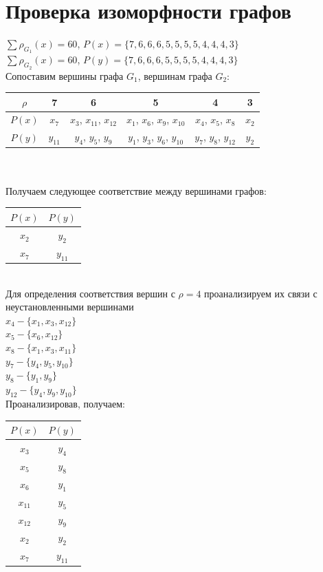 \documentclass[12pt,a4paper]{report}
\begin{document}
\section*{Проверка изоморфности графов}
$\sum\rho_{G_1}(x)=60$, $P(x)=\{7,6,6,6,5,5,5,5,4,4,4,3\}$\\
$\sum\rho_{G_2}(x)=60$, $P(y)=\{7,6,6,6,5,5,5,5,4,4,4,3\}$\\
\hfill\break
Сопоставим вершины графа $G_1$, вершинам графа $G_2$:\\
\hfill\break
\begin{tabular}{|c|c|c|c|c|c|}
    \hline
    $\rho$ & 7 & 6 & 5 & 4 & 3 \\
    \hline
    $P(x)$ & $x_7$ & $x_3$, $x_{11}$, $x_{12}$ & $x_1$, $x_6$, $x_9$, $x_{10}$ & $x_4$, $x_5$, $x_8$ & $x_2$ \\
    \hline
    $P(y)$ & $y_{11}$ & $y_4$, $y_5$, $y_9$ & $y_1$, $y_3$, $y_6$, $y_{10}$ & $y_7$, $y_8$, $y_{12}$ & $y_2$ \\
    \hline
\end{tabular}\\
\\
Получаем следующее соответствие между вершинами графов:\\
\hfill\break
\begin{tabular}{|c|c|}
    \hline
    $P(x)$ & $P(y)$ \\
    \hline
    $x_2$ & $y_2$ \\
    \hline
    $x_7$ & $y_{11}$ \\
    \hline
\end{tabular}\\
\hfill\break
Для определения соответствия вершин с $\rho=4$ проанализируем их связи с неустановленными вершинами\\
$x_4-\{x_1,x_3,x_{12}\}$\\
$x_5-\{x_6,x_{12}\}$\\
$x_8-\{x_1,x_3,x_{11}\}$\\
$y_7-\{y_4,y_5,y_{10}\}$\\
$y_8-\{y_1,y_9\}$\\
$y_{12}-\{y_4,y_9,y_{10}\}$\\
Проанализировав, получаем: \\
\hfill\break
\begin{tabular}{|c|c|}
    \hline
    $P(x)$ & $P(y)$ \\
    \hline
    $x_{3}$ & $y_4$ \\
    \hline
    $x_{5}$ & $y_8$ \\
    \hline
    $x_6$ & $y_1$ \\
    \hline
    $x_{11}$ & $y_5$ \\
    \hline
    $x_{12}$ & $y_9$ \\
    \hline
    \hline
    $x_2$ & $y_2$ \\
    \hline
    $x_7$ & $y_{11}$ \\
    \hline
\end{tabular}\\
\end{document}
